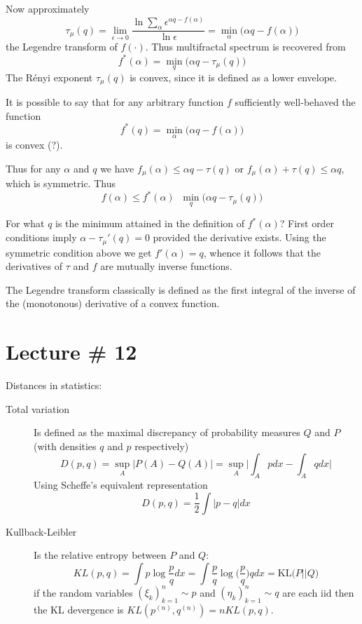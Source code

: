 \documentclass[a4paper]{article}
\newcommand{\defn}{\mathop{\overset{\Delta}{=}}\nolimits}
\begin{document}
Now approximately
\[\tau_\mu(q) = \lim_{\epsilon\to0} \frac{\ln \sum_\alpha \epsilon^{\alpha q - f(\alpha)}}{\ln \epsilon} = \min_\alpha \big( \alpha q - f(\alpha) \big)\]
the Legendre transform of $f(\cdot)$. Thus multifractal spectrum is recovered from
\[f^*(\alpha) = \min_q \Big( \alpha q - \tau_\mu(q) \Big)\]
The R\'enyi exponent $\tau_\mu(q)$ is convex, since it is defined as a lower envelope.

It is possible to say that for any arbitrary function $f$ sufficiently well-behaved the function
\[f^*(q) = \min_\alpha\big(\alpha q - f(\alpha)\big)\]
is convex (?).

Thus for any $\alpha$ and $q$ we have $f_\mu(\alpha)\leq \alpha q - \tau(q)$ or $f_\mu(\alpha) + \tau(q)\leq \alpha q$, which is symmetric. Thus
\[f(\alpha)\leq f^*(\alpha) \defn \min_q \Big( \alpha q - \tau_\mu(q) \Big)\]

For what $q$ is the minimum attained in the definition of $f^*(\alpha)$? First order conditions imply $\alpha - \tau_\mu'(q) = 0$ provided the derivative exists. Using the symmetric condition above we get $f'(\alpha) = q$, whence it follows that the derivatives of $\tau$ and $f$ are mutually inverse functions.

The Legendre transform classically is defined as the first integral of the inverse of the (monotonous) derivative of a convex function.



\section{Lecture \# 12} %
\label{sec:lecture_12}

Distances in statistics:
\begin{description}
	\item[Total variation] Is defined as the maximal discrepancy of probability measures $Q$ and $P$ (with densities $q$ and $p$ respectively)
	\[D(p,q) = \sup_A\Big\lvert P(A) -  Q(A) \Big\rvert = \sup_A\Big\lvert \int_A p dx -  \int_A q dx \Big\rvert\]
	Using Scheffe's equivalent representation \[D(p,q) = \frac{1}{2}\int|p-q| dx\]
	\item[Kullback-Leibler] Is the relative entropy between $P$ and $Q$:
	\[ KL(p,q) = \int p \log\frac{p}{q} dx = \int \frac{p}{q}\log\bigg(\frac{p}{q}\bigg) q dx = \text{KL}\big( P \lvert \rvert Q\big)\]
	if the random variables $(\xi_k)_{k=1}^n\sim p$ and $(\eta_k)_{k=1}^n\sim q$ are each iid then the KL devergence is $KL(p^{(n)},q^{(n)}) = n KL(p,q)$.
\end{description}
\end{document}
